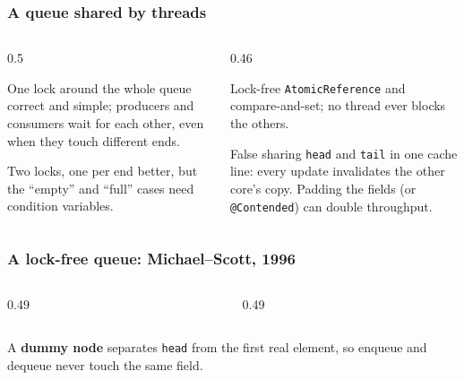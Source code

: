 \documentclass[aspectratio=169,10pt,compress]{beamer}
\begin{document}




\begin{frame}[t,fragile] \frametitle{A queue shared by threads}
  \begin{columns}[T]
    \begin{column}{0.5\textwidth}
      \begin{block}{One lock around the whole queue}
        \small correct and simple; producers and consumers wait for each other, even when they touch different ends.
      \end{block}
      \begin{block}{Two locks, one per end}
        \small better, but the ``empty'' and ``full'' cases need condition variables.
      \end{block}
    \end{column}
    \begin{column}{0.46\textwidth}
      \begin{block}{Lock-free}
        \small \texttt{AtomicReference} and compare-and-set; no thread ever blocks the others.
      \end{block}
      \begin{block}{False sharing}
        \small \texttt{head} and \texttt{tail} in one cache line: every update invalidates the other core's copy.
        Padding the fields (or \texttt{@Contended}) can double throughput.
      \end{block}
    \end{column}
  \end{columns}
\end{frame}




\begin{frame}[t,fragile] \frametitle{A lock-free queue: Michael--Scott, 1996}
  \begin{columns}[T]
    \begin{column}{0.49\textwidth}
    \end{column}
    \begin{column}{0.49\textwidth}
    \end{column}
  \end{columns}
  \small A \textbf{dummy node} separates \texttt{head} from the first real element, so enqueue and dequeue never touch the same field.
\end{frame}
\end{document}
